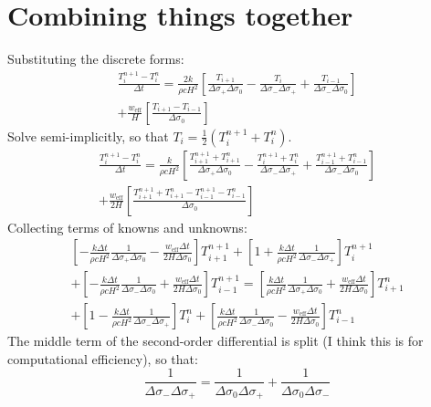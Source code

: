 \documentclass[10pt,english,a4paper]{article}
\begin{document}
\section{Combining things together}
%
Substituting the discrete forms:
%
\begin{multline}
\frac{T_{i}^{n+1}-T_{i}^{n}}{\Delta t}=\frac{2k}{\rho c H^2}\left[\frac{T_{i+1}}{\Delta \sigma_{+}\Delta \sigma_{0}}
-\frac{T_{i}}{\Delta \sigma_{-}\Delta \sigma_{+}}
+\frac{T_{i-1}}{\Delta \sigma_{-}\Delta \sigma_{0}}\right]\\
+\frac{w_{\mathrm{eff}}}{H}\left[\frac{T_{i+1}-T_{i-1}}{\Delta \sigma_0}\right]
\end{multline}
%
Solve semi-implicitly, so that $T_i=\frac{1}{2}(T_i^{n+1}+T_i^{n})$.
%
\begin{multline}
\frac{T_{i}^{n+1}-T_{i}^{n}}{\Delta t}=
\frac{k}{\rho c H^2}\left[\frac{T^{n+1}_{i+1}+T^{n}_{i+1}}{\Delta \sigma_{+}\Delta \sigma_{0}}
-\frac{T^{n+1}_{i}+T^{n}_{i}}{\Delta \sigma_{-}\Delta \sigma_{+}}
+\frac{T^{n+1}_{i-1}+T^n_{i-1}}{\Delta \sigma_{-}\Delta \sigma_{0}}\right]\\
+\frac{w_{\mathrm{eff}}}{2H}\left[\frac{T^{n+1}_{i+1}+T^{n}_{i+1}-T^{n+1}_{i-1}-T^{n}_{i-1}}{\Delta \sigma_0}\right]
\end{multline}
%
Collecting terms of knowns and unknowns:
%
\begin{multline}
\left[-\frac{k\Delta t}{\rho c H^2}\frac{1}{\Delta\sigma_{+}\Delta\sigma_{0}}-\frac{w_{\mathrm{eff}}\Delta t}{2H\Delta\sigma_0}\right]T^{n+1}_{i+1}
+\left[1+\frac{k\Delta t}{\rho c H^2}\frac{1}{\Delta\sigma_{-}\Delta\sigma_{+}}\right]T^{n+1}_i\\
+\left[-\frac{k\Delta t}{\rho c H^2}\frac{1}{\Delta\sigma_{-}\Delta\sigma_{0}}+\frac{w_{\mathrm{eff}}\Delta t}{2H\Delta\sigma_0}\right]T^{n+1}_{i-1}=
\left[\frac{k\Delta t}{\rho c H^2}\frac{1}{\Delta\sigma_{+}\Delta\sigma_{0}}+\frac{w_{\mathrm{eff}}\Delta t}{2H\Delta\sigma_0}\right]T^{n}_{i+1}\\
+\left[1-\frac{k\Delta t}{\rho c H^2}\frac{1}{\Delta\sigma_{-}\Delta\sigma_{+}}\right]T^{n}_i
+\left[\frac{k\Delta t}{\rho c H^2}\frac{1}{\Delta\sigma_{-}\Delta\sigma_{0}}-\frac{w_{\mathrm{eff}}\Delta t}{2H\Delta\sigma_0}\right]T^{n}_{i-1}
\end{multline}
%
The middle term of the second-order differential is split (I think this is for computational efficiency), so that:
%
\begin{equation}
\frac{1}{\Delta\sigma_{-}\Delta\sigma_{+}}=\frac{1}{\Delta\sigma_{0}\Delta\sigma_{+}}+\frac{1}{\Delta\sigma_{0}\Delta\sigma_{-}}
\end{equation}
\end{document}
